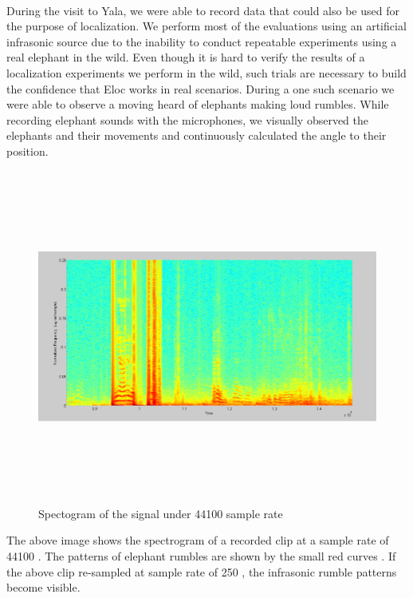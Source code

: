 \documentclass[12pt]{article}
\numberwithin{figure}{section}
\numberwithin{table}{section}
\begin{document}
\paragraph{}
During the visit to Yala, we were able to  record data that could also be used for the purpose of localization. We perform most of the evaluations using an artificial infrasonic source due to the inability to conduct repeatable experiments using a real elephant in the wild. Even though it is hard to verify the results of a localization experiments we perform in the wild, such trials are necessary to build the confidence that Eloc works in real scenarios. During a one such scenario we were able to observe a moving heard of elephants making loud rumbles. While recording elephant sounds with the microphones, we visually observed the elephants and their movements and continuously calculated the angle to their position.

\begin{figure}[H]
\centering
\includegraphics[width=14cm,height=11cm,keepaspectratio]{44100.png}
\caption{Spectogram of the signal under 44100 sample rate}
\label{d:44100}
\end{figure}

The above image shows the spectrogram of a recorded clip at a sample rate of 44100 . The patterns of elephant rumbles are shown by the small red curves \cite {19}. If the above clip re-sampled at sample rate of 250 , the infrasonic rumble patterns become visible.
\end{document}
